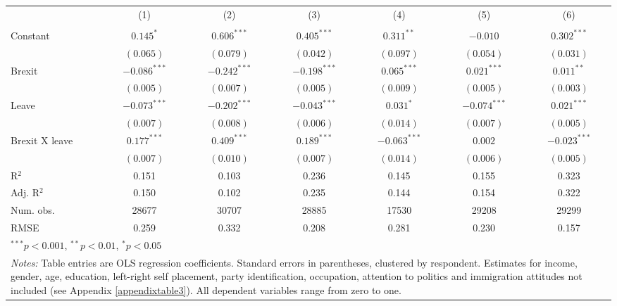 \documentclass[12pt, letter]{article}
\begin{document}
\begin{table}
\begin{center}
{\begin{tabular}{l c c c c c c}
\\[0pt]
 & (1) & (2) & (3) & (4) & (5) & (6) \\[3pt]
\cmidrule[1pt]{2-7}
\\[-12pt] 
Constant                         & $0.145^{*}$    & $0.606^{***}$  & $0.405^{***}$  & $0.311^{**}$   & $-0.010$       & $0.302^{***}$  \\
                                 & $(0.065)$      & $(0.079)$      & $(0.042)$      & $(0.097)$      & $(0.054)$      & $(0.031)$      \\
Brexit                           & $-0.086^{***}$ & $-0.242^{***}$ & $-0.198^{***}$ & $0.065^{***}$  & $0.021^{***}$  & $0.011^{**}$   \\
                                 & $(0.005)$      & $(0.007)$      & $(0.005)$      & $(0.009)$      & $(0.005)$      & $(0.003)$      \\
Leave                            & $-0.073^{***}$ & $-0.202^{***}$ & $-0.043^{***}$ & $0.031^{*}$    & $-0.074^{***}$ & $0.021^{***}$  \\
                                 & $(0.007)$      & $(0.008)$      & $(0.006)$      & $(0.014)$      & $(0.007)$      & $(0.005)$      \\
                                 Brexit X leave                   & $0.177^{***}$  & $0.409^{***}$  & $0.189^{***}$  & $-0.063^{***}$ & $0.002$        & $-0.023^{***}$ \\
                                 & $(0.007)$      & $(0.010)$      & $(0.007)$      & $(0.014)$      & $(0.006)$      & $(0.005)$      \\
\hline
R$^2$                            & 0.151          & 0.103          & 0.236          & 0.145          & 0.155          & 0.323          \\
Adj. R$^2$                       & 0.150          & 0.102          & 0.235          & 0.144          & 0.154          & 0.322          \\
Num. obs.                        & 28677          & 30707          & 28885          & 17530          & 29208          & 29299          \\
RMSE                             & 0.259          & 0.332          & 0.208          & 0.281          & 0.230          & 0.157          \\
\toprule[1.5pt]
\multicolumn{7}{l}{\scriptsize{$^{***}p<0.001$, $^{**}p<0.01$, $^*p<0.05$}} \\
\multicolumn{7}{l}{\multirow{3}{500pt}{\footnotesize{\textit{Notes:} Table entries are OLS regression coefficients. Standard errors in parentheses, clustered by respondent. Estimates for income, gender, age, education, left-right self placement, party identification, occupation, attention to politics and immigration attitudes not included (see Appendix \ref{appendixtable3}). All dependent variables range from zero to one.}}} \\
\end{tabular}
}
\label{table:shortterm}
\end{center}
\end{table}
\end{document}
